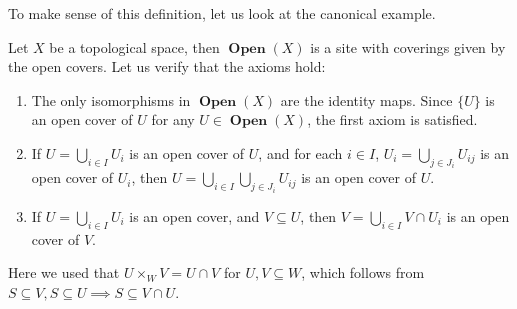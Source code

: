 \documentclass{article}
\DeclareMathOperator{\Open}{\mathbf{Open}}
\begin{document}
To make sense of this definition, let us look at the
canonical example.
\begin{example}
    Let $X$ be a topological space, then $\Open(X)$ is a
    site with coverings given by the open covers.
    Let us verify that the axioms hold:
    \begin{enumerate}
        \item The only isomorphisms in $\Open(X)$ are the identity maps.
              Since $\{U\}$ is an open cover of $U$ for any $U \in \Open(X)$,
              the first axiom is satisfied.
        \item If $U = \bigcup_{i\in I} U_i$ is an open cover of $U$,
              and for each $i \in I$, $U_i = \bigcup_{j\in J_i} U_{ij}$ is an
              open cover of $U_i$, then $U = \bigcup_{i\in I}\bigcup_{j \in J_i} U_{ij}$
              is an open cover of $U$.
        \item If $U = \bigcup_{i\in I} U_i$ is an open cover, and $V \subseteq U$, then
              $V = \bigcup_{i \in I} V \cap U_i$ is an open cover of $V$.
    \end{enumerate}
    Here we used that $U\times_W V = U\cap V$ for $U, V \subseteq W$,
    which follows from $S \subseteq V, S \subseteq U \implies S \subseteq V\cap U$.
\end{example}
\end{document}
